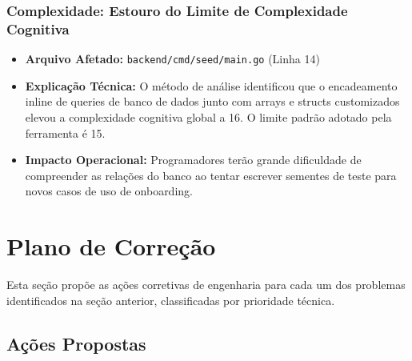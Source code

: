 \documentclass[12pt,a4paper]{article}
\begin{document}
\subsubsection{Complexidade: Estouro do Limite de Complexidade Cognitiva}
\begin{itemize}
    \item \textbf{Arquivo Afetado:} \texttt{backend/cmd/seed/main.go} (Linha 14)
    \item \textbf{Explicação Técnica:} O método de análise identificou que o encadeamento inline de queries de banco de dados junto com arrays e structs customizados elevou a complexidade cognitiva global a 16. O limite padrão adotado pela ferramenta é 15.
    \item \textbf{Impacto Operacional:} Programadores terão grande dificuldade de compreender as relações do banco ao tentar escrever sementes de teste para novos casos de uso de onboarding.
\end{itemize}

\section{Plano de Correção}

Esta seção propõe as ações corretivas de engenharia para cada um dos problemas identificados na seção anterior, classificadas por prioridade técnica.

\subsection{Ações Propostas}
\end{document}
